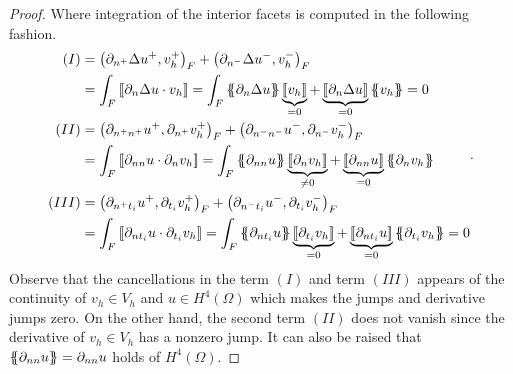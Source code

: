 \begin{proof}
Where integration of the interior facets is computed in the following fashion.
\begin{equation}
    \label{eq:dg2_facets}
    \begin{split}
        (I) &  =    \left(\partial _{n^{+}} \Delta  u^{+} ,v_h^{+}\right)_{F} +
        \left(\partial _{n^{-}} \Delta  u^{-} ,v_h^{-}\right)_{F}  \\
            & =   \int_{F}^{}
            \jump{ \partial _{n} \Delta  u \cdot v_h } =
            \int_{F}^{}
            \mean{ \partial _{n} \Delta  u } \underbrace{\jump{ v_h }}_{= 0}    + \underbrace{\jump{ \partial _{n} \Delta  u
            }}_{= 0}    \mean{ v_h } = 0 \\
            (II) &  =     \left(\partial _{n^{+}n^{+}} u^{+}, \partial_{n^{+}} v_h^{+} \right)_{F} +  \left(\partial _{n^{-}n^{-}} u^{-}, \partial_{n^{-}} v_h^{-} \right)_{F}    \\
                 &= \int_{F}^{} \jump{ \partial _{nn} u \cdot  \partial_{n} v_h }   = \int_{F}^{}
                       \mean{ \partial _{nn} u    } \underbrace{\jump{ \partial_{n} v_h }  }_{\neq 0}    + \underbrace{\jump{ \partial
                               _{nn}  u
                       }}_{= 0}    \mean{ \partial _{n}v_h } \\
            (III) &  =     \left(\partial _{n^{+}t_{i}} u^{+}, \partial_{t_{i}} v_h^{+}
                \right)_{F} +  \left(\partial _{n^{-}t_{i}} u^{-}, \partial_{t_{i}} v_h^{-}
                \right)_{F}   \\
                 &  =   \int_{F}^{}
                 \jump{ \partial _{nt_{i}} u \cdot  \partial_{t_{i}} v_h } =
                 \int_{F}^{}
                 \mean{ \partial _{nt_{i}} u    } \underbrace{\jump{ \partial_{t_{i}} v_h }  }_{= 0}    + \underbrace{\jump{ \partial
                         _{nt_{i}}  u
                 }}_{= 0}    \mean{ \partial _{t_{i}}v_h }  = 0
                   \end{split}
.\end{equation}
Observe that the cancellations in the term $(I)$ and term $(III)$  appears of the continuity of $v_h\in V_{h} $ and $u\in H^{4}( \Omega ) $ which makes the jumps and derivative jumps zero. On the other hand, the second term $(II)$  does not vanish
since the derivative of $v_h \in V_{h}$ has a nonzero jump. It can also be raised that $\left\{\!\!\left\{
\partial _{nn} u \right\}\!\!\right\} = \partial _{nn} u  $ holds of $H^{4}( \Omega  ) $.


\end{proof}
